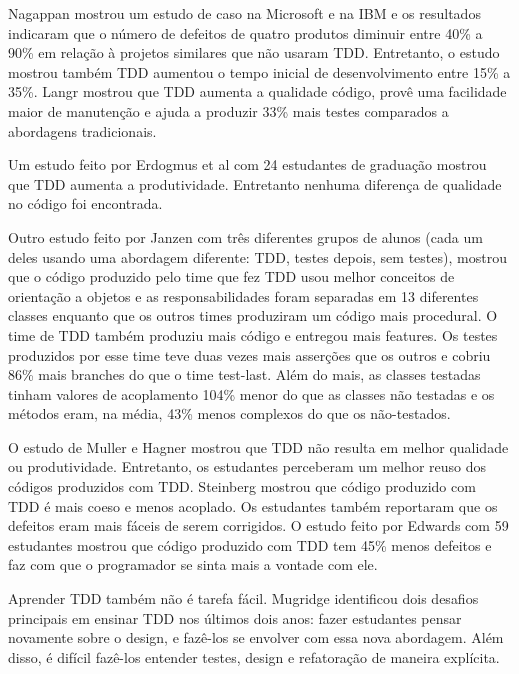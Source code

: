 Nagappan \cite{nagappan-ms} mostrou um estudo de caso na Microsoft e na IBM e os
resultados indicaram que o número de defeitos de quatro produtos diminuir entre 
40\% a 90\% em relação à projetos similares que não usaram TDD. Entretanto, o 
estudo mostrou também TDD aumentou o tempo inicial de desenvolvimento entre 15\%
a 35\%. Langr \cite{langr} mostrou que TDD aumenta a qualidade código, provê uma 
facilidade maior de manutenção e ajuda a produzir 33\% mais testes comparados  a
abordagens tradicionais.

Um estudo feito por Erdogmus et al \cite{erdogmus-morisio} com 24 estudantes de
graduação mostrou que TDD aumenta a produtividade. Entretanto nenhuma diferença 
de qualidade no código foi encontrada.

Outro estudo feito por Janzen \cite{janzen-saiedian} com três diferentes grupos
de alunos (cada um deles usando uma abordagem diferente: TDD, testes depois, sem
testes), mostrou que o código produzido pelo time que fez TDD usou melhor
conceitos  de orientação a objetos e as responsabilidades foram separadas em 13 
diferentes classes enquanto que os outros times produziram um código mais
procedural. O time de TDD também produziu mais código e entregou mais features.
Os testes produzidos por esse time teve duas vezes mais asserções que os outros 
e cobriu 86\% mais branches do que o time test-last. Além do mais, as classes 
testadas tinham valores de acoplamento 104\% menor do que as classes não
testadas e os métodos eram, na média, 43\% menos complexos do que os
não-testados.

O estudo de Muller e Hagner \cite{muller-e-hagner} mostrou que TDD não resulta
em melhor qualidade ou produtividade. Entretanto, os estudantes perceberam um 
melhor reuso dos códigos produzidos com TDD. Steinberg \cite{steinberg} mostrou
que código produzido com TDD é mais coeso e menos acoplado. Os estudantes também
reportaram que os defeitos eram mais fáceis de serem corrigidos. O estudo feito
por Edwards \cite{edwards} com 59 estudantes mostrou que código produzido com
TDD tem 45\% menos defeitos e faz com que o programador se sinta mais a vontade
com ele.

Aprender TDD também não é tarefa fácil. Mugridge \cite{mugridge} identificou
dois desafios principais em ensinar TDD nos últimos dois anos: fazer estudantes
pensar novamente sobre o design, e fazê-los se envolver com essa nova
abordagem. Além disso, é difícil fazê-los entender testes, design e refatoração
de maneira explícita.



